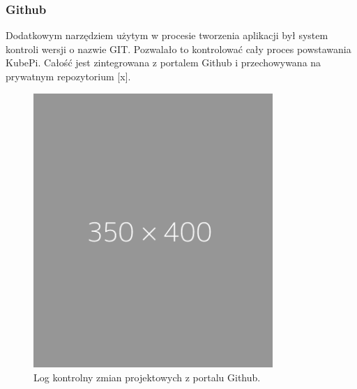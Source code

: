 \documentclass[12pt]{report}
\let\Oldsubsubsection\subsubsection
\renewcommand{\subsubsection}{\FloatBarrier\Oldsubsubsection}
\begin{document}
{\subsubsection{Github}
Dodatkowym narzędziem użytym w procesie tworzenia aplikacji był system kontroli wersji o nazwie GIT. Pozwalało to kontrolować cały proces powstawania KubePi. Całość jest zintegrowana z portalem Github i przechowywana na prywatnym repozytorium [x]. %
\begin{figure}[h]
	\centering
	\includegraphics[width=0.81\textwidth]{images/placeholder.png}
	\caption{Log kontrolny zmian projektowych z portalu Github.}
\end{figure}
}
\end{document}

